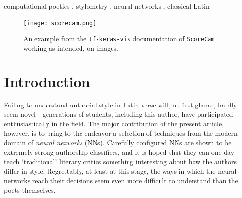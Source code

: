 \documentclass[
    twocolumn,
    hf,
]{ceurart}
\begin{document}
\begin{keywords}
    computational poetics \sep
    stylometry \sep
    neural networks \sep
    classical Latin
\end{keywords}

\maketitle

\begin{figure}
    \texttt{[image: scorecam.png]}
    \caption{An example from the \texttt{tf-keras-vis} documentation
        of \texttt{ScoreCam} working as intended, on images.}
    \label{fig:sc_img}
\end{figure}

\section{Introduction}

Failing to understand authorial style in Latin verse will, at first glance,
hardly seem novel---generations of students, including this author, have
participated enthusiastically in the field. The major contribution of the
present article, however, is to bring to the endeavor a selection of techniques
from the modern domain of \emph{neural networks} (NNs). Carefully configured NNs
are shown to be extremely strong authorship classifiers, and it is hoped that
they can one day teach `traditional' literary critics something interesting
about how the authors differ in style. Regrettably, at least at this stage, the
ways in which the neural networks reach their decisions seem even more difficult
to understand than the poets themselves.
\end{document}
